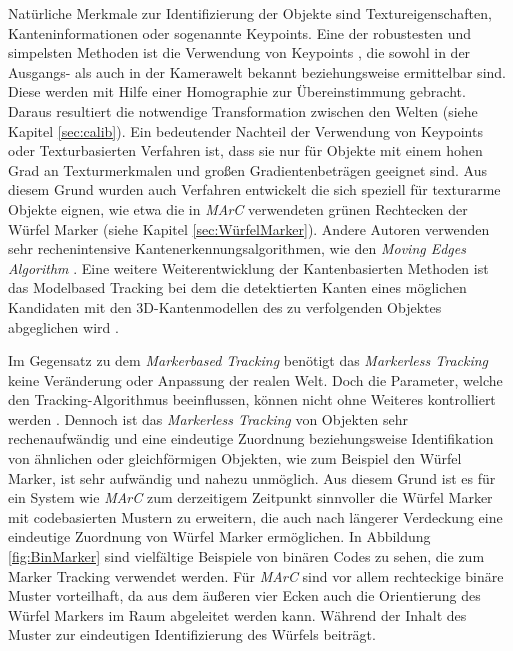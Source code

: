 Natürliche Merkmale zur Identifizierung der Objekte sind Textureigenschaften, Kanteninformationen oder sogenannte Keypoints. Eine der robustesten und simpelsten Methoden ist die Verwendung von Keypoints \cite{article:MarkerLessBarandiaran2010}\cite{article:MarkerLessWagner:}\cite{article:MarkerLessComport}\cite{article:MarkerLessLowe}, die sowohl in der Ausgangs- als auch in der Kamerawelt bekannt beziehungsweise ermittelbar sind. Diese werden mit Hilfe einer Homographie zur Übereinstimmung gebracht. Daraus resultiert die notwendige Transformation zwischen den Welten (siehe Kapitel \ref{sec:calib}). Ein bedeutender Nachteil der Verwendung von Keypoints oder Texturbasierten Verfahren ist, dass sie nur für Objekte mit einem hohen Grad an Texturmerkmalen und großen Gradientenbeträgen geeignet sind. Aus diesem Grund wurden auch Verfahren \cite{article:MarkerLessStrucktHinterstoisser}\cite{article:MarkerLessStrucktDamen}\cite{article:MarkerLessStrucktPark} entwickelt die sich speziell für texturarme Objekte eignen, wie etwa die in \textit{MArC} verwendeten grünen Rechtecken der Würfel Marker (siehe Kapitel \ref{sec:WürfelMarker}). Andere Autoren verwenden sehr rechenintensive Kantenerkennungsalgorithmen, wie den \textit{Moving Edges Algorithm} \cite{article:MarkerLessEdgeMarchand}. Eine weitere Weiterentwicklung der Kantenbasierten Methoden ist das Modelbased Tracking bei dem die detektierten Kanten eines möglichen Kandidaten mit den 3D-Kantenmodellen des zu verfolgenden Objektes abgeglichen wird \cite{article:MarkerLessModellVacchetti}\cite{article:MarkerLessEdgeAlvarez}\cite{article:MarkerLessEdgeWu}\cite{article:MarkerLessBlasko}.

Im Gegensatz zu dem \textit{Markerbased Tracking} benötigt das \textit{Markerless Tracking} keine Veränderung oder Anpassung der realen Welt. Doch die Parameter, welche den Tracking-Algorithmus beeinflussen, können nicht ohne Weiteres kontrolliert werden \cite{article:MarkerLessBarandiaran2010}. Dennoch ist das \textit{Markerless Tracking} von Objekten sehr rechenaufwändig und eine eindeutige Zuordnung beziehungsweise Identifikation von ähnlichen oder gleichförmigen Objekten, wie zum Beispiel den Würfel Marker, ist sehr aufwändig und nahezu unmöglich. Aus diesem Grund ist es für ein System wie \textit{MArC} zum derzeitigem Zeitpunkt sinnvoller die Würfel Marker mit codebasierten Mustern zu erweitern, die auch nach längerer Verdeckung eine eindeutige Zuordnung von Würfel Marker ermöglichen. In Abbildung \ref{fig:BinMarker} sind vielfältige Beispiele von binären Codes zu sehen, die zum Marker Tracking verwendet werden. Für \textit{MArC} sind vor allem rechteckige binäre Muster vorteilhaft, da aus dem äußeren vier Ecken auch die Orientierung des Würfel Markers im Raum abgeleitet werden kann. Während der Inhalt des Muster zur eindeutigen Identifizierung des Würfels beiträgt. 

